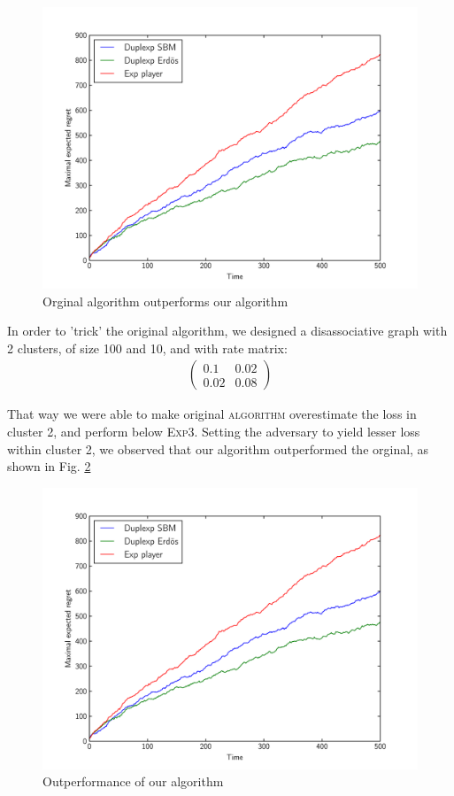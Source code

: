 \documentclass[11pt,a4paper]{article}
\begin{document}
\begin{figure}[ht]
	\centering
	\includegraphics[width=\textwidth]{easy}
	\caption{Orginal algorithm outperforms our algorithm}
	\label{fig:easy}
\end{figure}

In order to 'trick' the original algorithm, we designed a disassociative graph with 2 clusters, of size 100 and 10, and with rate matrix:
\begin{align*}
\begin{pmatrix}
0.1 &0.02 \\
0.02 & 0.08
\end{pmatrix}
\end{align*}

That way we were able to make original \textsc{algorithm} overestimate the loss in cluster 2, and perform below \textsc{Exp3}. Setting the adversary to yield lesser loss within cluster 2, we observed that our algorithm outperformed the orginal, as shown in Fig. \ref{fig:hard}

\begin{figure}[ht]
	\centering
	\includegraphics[width=\textwidth]{easy}
	\caption{Outperformance of our algorithm}
	\label{fig:hard}
\end{figure}
\end{document}

